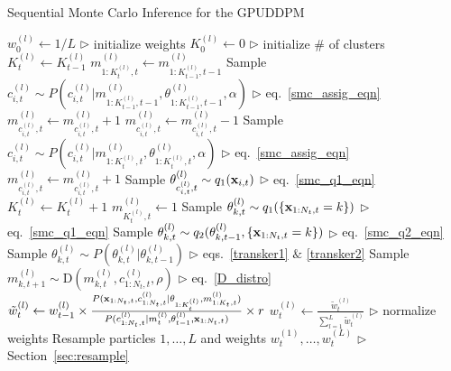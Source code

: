 \documentclass{article}
\begin{document}
\begin{algorithm*}[!]
\caption{Sequential Monte Carlo Inference for the GPUDDPM}
\label{alg:SMC}
\begin{algorithmic}[1]
\STATE $w_{0}^{(l)} \leftarrow 1/L$ \hfill $\triangleright$ initialize weights
\ENDFOR
\STATE $K_{0}^{(l)} \leftarrow 0$ \hfill $\triangleright$ initialize \# of clusters
\STATE $K_{t}^{(l)}  \leftarrow K_{t-1}^{(l)}$
\STATE $m_{1:K_{t}^{(l)}, t}^{(l)} \leftarrow m_{1:K_{t-1}^{(l)}, t-1}^{(l)}$
\STATE Sample $c_{i,t}^{(l)} \sim P \left( c_{i,t}^{(l)} | m_{1:K_{t-1}^{(l)}, t-1}^{(l)}, \theta_{1:K_{t-1}^{(l)}, t-1}^{(l)}, \alpha \right)$  \hfill $\triangleright$ eq.~\eqref{smc_assig_eqn}
\STATE $m_{c_{i,t}^{(l)},t}^{(l)} \leftarrow m_{c_{i,t}^{(l)},t}^{(l)} + 1$
\ELSE
\STATE $m_{c_{i,t}^{(l)},t}^{(l)} \leftarrow m_{c_{i,t}^{(l)},t}^{(l)} - 1$
\STATE Sample $c_{i,t}^{(l)} \sim P \left( c_{i,t}^{(l)} | m_{1:K_{t}^{(l)}, t}^{(l)}, \theta_{1:K_{t}^{(l)}, t}^{(l)}, \alpha \right)$  \hfill $\triangleright$ eq.~\eqref{smc_assig_eqn}
\STATE $m_{c_{i,t}^{(l)},t}^{(l)} \leftarrow m_{c_{i,t}^{(l)},t}^{(l)} + 1$
\ENDIF
{}
\STATE Sample $\theta_{c_{i,t}^{(l)}, t}^{(l)} \sim q_{1}(\bold{x}_{i,t})$ \hfill $\triangleright$ eq.~\eqref{smc_q1_eqn}
\STATE $K_{t}^{(l)} \leftarrow K_{t}^{(l)} + 1$
\STATE $m_{K_{t}^{(l)},t}^{(l)} \leftarrow 1$
\ENDIF
\ENDFOR
{}
\STATE Sample $\theta_{k,t}^{(l)} \sim q_{1}(\{ \bold{x}_{1:N_{t}, t} = k \})$  \hfill $\triangleright$ eq.~\eqref{smc_q1_eqn}
\STATE Sample $\theta_{k,t}^{(l)} \sim q_{2}(\theta_{k,t-1}^{(l)}, \{ \bold{x}_{1:N_{t}, t} = k \})$  \hfill $\triangleright$ eq.~\eqref{smc_q2_eqn}
\STATE Sample $\theta_{k,t}^{(l)} \sim P(\theta_{k,t}^{(l)} | \theta_{k,t-1}^{(l)})$  \hfill $\triangleright$ eqs.~\eqref{transker1} $\&$ \eqref{transker2}
\ENDIF
{}
\STATE Sample $m_{k,t+1}^{(l)} \sim \text{D}(m_{k,t}^{(l)}, c_{1:N_{t}, t}^{(l)}, \rho)$  \hfill $\triangleright$ eq.~\eqref{D_distro}
\ENDIF
\ENDFOR
\ENDFOR
\STATE $\tilde{w}_{t}^{(l)} \leftarrow w_{t-1}^{(l)} \times \frac{ P(\bold{x}_{1:N_{t},t}, c_{1:N_{t}, t}^{(l)} | \theta_{1:K_{t}^{(l)}}, m_{1:K_{t},t}^{(l)})} {P(c_{1:N_{t}, t}^{(l)} | m_{t}^{(l)}, \theta_{t-1}^{(l)}, \bold{x}_{1:N_{t},t} ) } \times r $  %
\ENDFOR
{}
\STATE $w_{t}^{(l)} \leftarrow \frac{\tilde{w}_{t}^{(l)}}{\sum_{l=1}^{L} \tilde{w}_{t}^{(l)} }$   \hfill $\triangleright$ normalize weights
\ENDFOR
\STATE Resample particles $1, \ldots, L$ and weights $w_{t}^{(1)}, \ldots, w_{t}^{(L)}$   \hfill $\triangleright$ Section~\ref{sec:resample}
\ENDFOR
\end{algorithmic}
\end{algorithm*}
\end{document}
